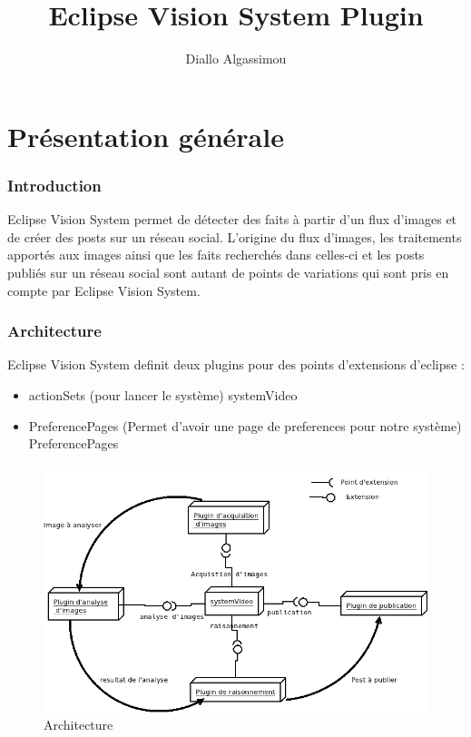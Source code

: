 \documentclass[a4paper , 12pt]{article}
\title{\bf Eclipse Vision System Plugin}
\author{Diallo Algassimou}
\begin{document}
\maketitle
\tableofcontents

\part*{Présentation générale}
\section{Introduction}
Eclipse Vision System permet de détecter des faits à partir d'un flux d'images et de créer des posts sur un réseau social. L'origine du flux d'images, les traitements apportés aux images ainsi que les faits recherchés dans celles-ci et les posts publiés sur un réseau social sont autant de points de variations qui sont pris en compte par Eclipse Vision System.

\section{Architecture}
Eclipse Vision System definit deux plugins pour des points d'extensions d'eclipse :
\begin{itemize}
\item actionSets (pour lancer le système) systemVideo
\item PreferencePages (Permet d'avoir une page de preferences pour notre système) PreferencePages
\end{itemize}

\begin{figure}
  \includegraphics[scale=0.5]{images/architecture.png}
  \caption{Architecture}
  \label{fig:architecture}
\end{figure}
\end{document}
